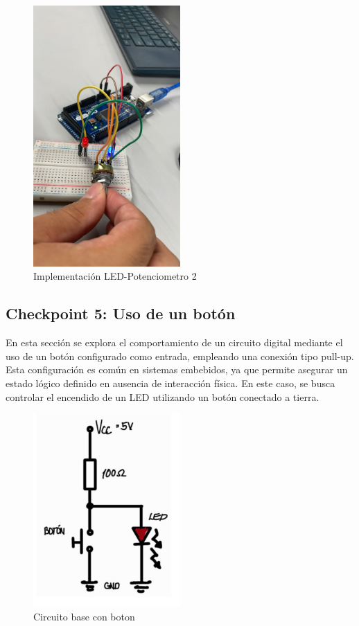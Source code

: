 \documentclass{article}
\begin{document}
\begin{figure}[H]
    \centering
    \includegraphics[width=0.50\textwidth]{./img/chkp-3-4-1.jpeg}
    \caption{Implementación LED-Potenciometro 2}
    \label{img:chkp-3-4-1}
\end{figure}

\subsection{Checkpoint 5: Uso de un botón}
En esta sección se explora el comportamiento de un circuito digital mediante el uso de un botón configurado como entrada, empleando una conexión tipo pull-up. Esta configuración es común en sistemas embebidos, ya que permite asegurar un estado lógico definido en ausencia de interacción física. En este caso, se busca controlar el encendido de un LED utilizando un botón conectado a tierra.

\begin{figure}[H]
    \centering
    \includegraphics[width=0.50\textwidth]{./img/Circuito-boton.png}
    \caption{Circuito base con boton}
    \label{fig:simulacion_esquema7}
\end{figure}
\end{document}
